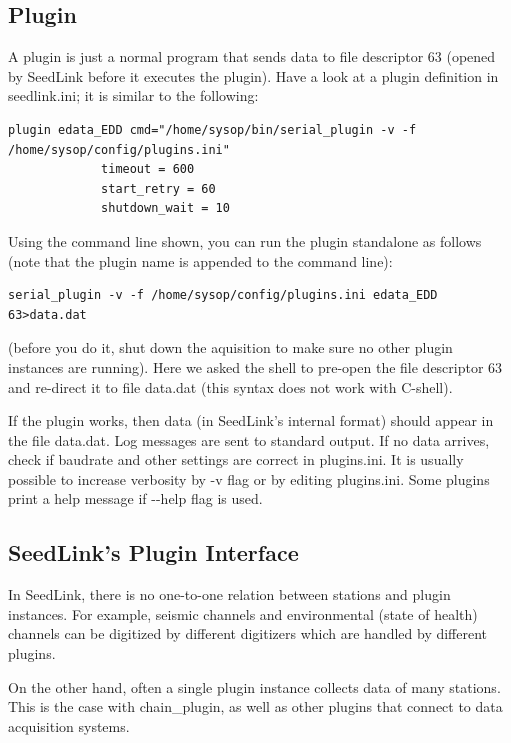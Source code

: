 \documentclass[11pt,a4paper,titlepage]{article}
\begin{document}
\subsection{Plugin}

A plugin is just a normal program that sends data to file descriptor 63
(opened by SeedLink before it executes the plugin). Have a look at a
plugin definition in seedlink.ini; it is similar to the following:

\begin{verbatim}
plugin edata_EDD cmd="/home/sysop/bin/serial_plugin -v -f /home/sysop/config/plugins.ini"
             timeout = 600
             start_retry = 60
             shutdown_wait = 10
\end{verbatim}

Using the command line shown, you can run the plugin standalone as follows
(note that the plugin name is appended to the command line):

\begin{verbatim}
serial_plugin -v -f /home/sysop/config/plugins.ini edata_EDD 63>data.dat
\end{verbatim}

(before you do it, shut down the aquisition to make sure no other plugin
instances are running). Here we asked the shell to pre-open the file
descriptor 63 and re-direct it to file data.dat (this syntax does not work
with C-shell).

If the plugin works, then data (in SeedLink's internal format) should
appear in the file data.dat. Log messages are sent to standard output. If
no data arrives, check if baudrate and other settings are correct in
plugins.ini. It is usually possible to increase verbosity by -v flag or by
editing plugins.ini. Some plugins print a help message if -{}-help flag is
used.


\subsection{SeedLink's Plugin Interface}

In SeedLink, there is no one-to-one relation between stations and plugin
instances. For example, seismic channels and environmental (state of
health) channels can be digitized by different digitizers which are handled
by different plugins.

On the other hand, often a single plugin instance collects data of many
stations. This is the case with chain\_plugin, as well as other plugins
that connect to data acquisition systems.
\end{document}
